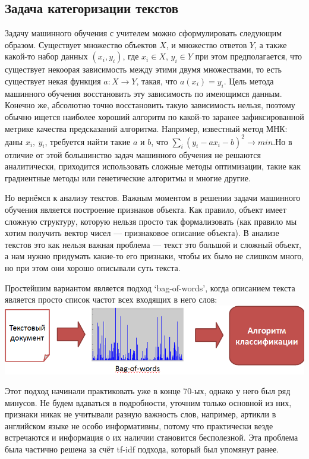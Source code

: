 \documentclass[a4paper,14pt]{extarticle}
\begin{document}
\subsection{Задача категоризации текстов}
Задачу машинного обучения с учителем можно сформулировать следующим образом. Существует множество объектов $X$, и множество ответов $Y$, а также какой-то набор данных $(x_i, y_i)$, где $x_i \in X$, $y_i \in Y$ при этом предполагается, что существует некоорая зависимость между этими двумя множествами, то есть существует некая функция $a \colon X \to Y$, такая, что $a(x_i) = y_i$. Цель метода машинного обучения восстановить эту зависимость по имеющимся данным. Конечно же, абсолютно точно восстановить такую зависимость нельзя, поэтому обычно ищется наиболее хороший алгоритм по какой-то заранее зафиксированной метрике качества предсказаний алгоритма. Например, известный метод МНК: даны $x_i,~y_i$, требуется найти такие $a$ и $b$, что $\sum_i (y_i - a x_i - b)^2 \to min$.Но в отличие от этой большинство задач машинного обучения не решаются аналитически, приходится использовать сложные методы оптимизации, такие как градиентные методы или генетические алгоритмы и многие другие.

Но вернёмся к анализу текстов. Важным моментом в решении задачи машинного обучения является построение признаков объекта. Как правило, объект имеет сложную структуру, которую нельзя просто так формализовать (как правило мы хотим получить вектор чисел --- признаковое описание объекта). В анализе текстов это как нельзя важная проблема --- текст это большой и сложный объект, а нам нужно придумать какие-то его признаки, чтобы их было не слишком много, но при этом они хорошо описывали суть текста.

Простейшим вариантом является подход `bag-of-words', когда описанием текста является просто список частот всех входящих в него слов:
\includegraphics[width=1.0\linewidth]{bag_of_words.png}

Этот подход начинали практиковать уже в конце 70-ых, однако у него был ряд минусов. Не будем вдаваться в подробности, уточним только основной из них, признаки никак не учитывали разную важность слов, например, артикли в английском языке не особо информативны, потому что практически везде встречаются и информация о их наличии становится бесполезной. Эта проблема была частично решена за счёт tf-idf подхода, который был упомянут ранее.
\end{document}
